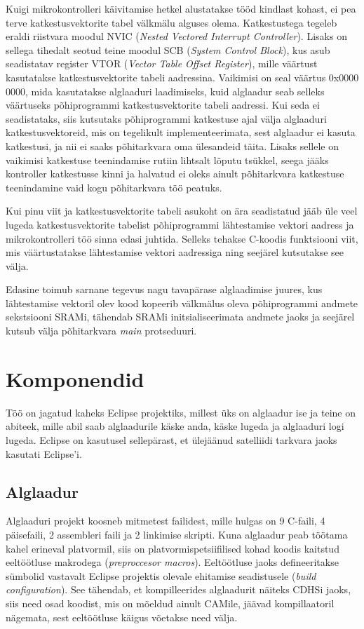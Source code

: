 \documentclass[12pt,a4paper]{article}
\begin{document}
Kuigi mikrokontrolleri käivitamise hetkel alustatakse tööd kindlast kohast, ei
pea terve katkestusvektorite tabel välkmälu alguses olema. Katkestustega tegeleb
eraldi riistvara moodul NVIC (\textit{Nested Vectored Interrupt Controller}).
Lisaks on sellega tihedalt seotud teine moodul SCB (\textit{System Control
Block}), kus asub seadistatav register VTOR (\textit{Vector Table Offset
Register}), mille väärtust kasutatakse katkestusvektorite tabeli aadressina.
\cite[ptk~4.4]{CM3pm} Vaikimisi on seal väärtus 0x0000 0000, mida kasutatakse alglaaduri
laadimiseks, kuid alglaadur seab selleks väärtuseks põhiprogrammi
katkestusvektorite tabeli aadressi. Kui seda ei seadistataks, siis kutsutaks
põhiprogrammi katkestuse ajal välja alglaaduri katkestusvektoreid, mis on
tegelikult implementeerimata, sest alglaadur ei kasuta katkestusi, ja nii ei
saaks põhitarkvara oma ülesandeid täita. Lisaks sellele on vaikimisi katkestuse
teenindamise rutiin lihtsalt lõputu tsükkel, seega jääks kontroller katkestusse
kinni ja halvatud ei oleks ainult põhitarkvara katkestuse teenindamine vaid kogu
põhitarkvara töö peatuks.

Kui pinu viit ja katkestusvektorite tabeli asukoht on ära seadistatud jääb üle
veel lugeda katkestusvektorite tabelist põhiprogrammi lähtestamise vektori
aadress ja mikrokontrolleri töö sinna edasi juhtida. Selleks tehakse C-koodis
funktsiooni viit, mis väärtustatakse lähtestamise vektori aadressiga ning
seejärel kutsutakse see välja.

Edasine toimub sarnane tegevus nagu tavapärase alglaadimise juures, kus
lähtestamise vektoril olev kood kopeerib välkmälus oleva põhiprogrammi andmete
sekstsiooni SRAMi, tähendab SRAMi initsialiseerimata andmete jaoks ja seejärel
kutsub välja põhitarkvara \textit{main} protseduuri.


\section{Komponendid}
Töö on jagatud kaheks Eclipse projektiks, millest üks on alglaadur ise ja teine on
abiteek, mille abil saab alglaadurile käske anda, käske lugeda ja alglaaduri
logi lugeda. Eclipse on kasutusel sellepärast, et ülejäänud satelliidi tarkvara jaoks
kasutati Eclipse'i. 

\subsection{Alglaadur}
Alglaaduri projekt koosneb mitmetest failidest, mille hulgas on 9 C-faili, 4
päisefaili, 2 assembleri faili ja 2 linkimise skripti. Kuna alglaadur peab töötama kahel erineval
platvormil, siis on platvormispetsiifilised kohad koodis kaitstud eeltöötluse
makrodega (\textit{preproccesor macros}). Eeltöötluse jaoks defineeritakse
sümbolid vastavalt Eclipse projektis olevale ehitamise seadistusele
(\textit{build configuration}). See tähendab, et kompilleerides alglaadurit
näiteks CDHSi jaoks, siis need osad koodist, mis on mõeldud ainult CAMile,
jäävad kompillaatoril nägemata, sest eeltöötluse käigus võetakse need välja.
\end{document}
